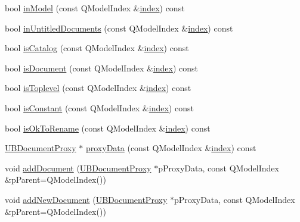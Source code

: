 \begin{DoxyCompactItemize}
bool \hyperlink{class_u_b_document_tree_model_a0177775331c363f33b5ed3139c14adc6}{in\-Model} (const Q\-Model\-Index \&\hyperlink{class_u_b_document_tree_model_a482d152ef1865a960d12f7d8726133b9}{index}) const 
\item 
bool \hyperlink{class_u_b_document_tree_model_a05755d6ea8c17fb69c62744c516566cd}{in\-Untitled\-Documents} (const Q\-Model\-Index \&\hyperlink{class_u_b_document_tree_model_a482d152ef1865a960d12f7d8726133b9}{index}) const 
\item 
bool \hyperlink{class_u_b_document_tree_model_a37960814e9120332dcdd89a88822737f}{is\-Catalog} (const Q\-Model\-Index \&\hyperlink{class_u_b_document_tree_model_a482d152ef1865a960d12f7d8726133b9}{index}) const 
\item 
bool \hyperlink{class_u_b_document_tree_model_ad6186a892df7569976b194849f17ff3f}{is\-Document} (const Q\-Model\-Index \&\hyperlink{class_u_b_document_tree_model_a482d152ef1865a960d12f7d8726133b9}{index}) const 
\item 
bool \hyperlink{class_u_b_document_tree_model_aba3afb7cd6c13d0b0b4eaaff4a521974}{is\-Toplevel} (const Q\-Model\-Index \&\hyperlink{class_u_b_document_tree_model_a482d152ef1865a960d12f7d8726133b9}{index}) const 
\item 
bool \hyperlink{class_u_b_document_tree_model_a55e684b2dc7fc9d961427b6b0313a2df}{is\-Constant} (const Q\-Model\-Index \&\hyperlink{class_u_b_document_tree_model_a482d152ef1865a960d12f7d8726133b9}{index}) const 
\item 
bool \hyperlink{class_u_b_document_tree_model_af562feb274191bf03e9656d27e177bef}{is\-Ok\-To\-Rename} (const Q\-Model\-Index \&\hyperlink{class_u_b_document_tree_model_a482d152ef1865a960d12f7d8726133b9}{index}) const 
\item 
\hyperlink{class_u_b_document_proxy}{U\-B\-Document\-Proxy} $\ast$ \hyperlink{class_u_b_document_tree_model_a2a35491b48b06e68645640eafc4b3ecc}{proxy\-Data} (const Q\-Model\-Index \&\hyperlink{class_u_b_document_tree_model_a482d152ef1865a960d12f7d8726133b9}{index}) const 
\item 
void \hyperlink{class_u_b_document_tree_model_ab34df78baad9b58d8e8c3f3a32bee007}{add\-Document} (\hyperlink{class_u_b_document_proxy}{U\-B\-Document\-Proxy} $\ast$p\-Proxy\-Data, const Q\-Model\-Index \&p\-Parent=Q\-Model\-Index())
\item 
void \hyperlink{class_u_b_document_tree_model_a8db99af8fb17b580f381b4bfe120918d}{add\-New\-Document} (\hyperlink{class_u_b_document_proxy}{U\-B\-Document\-Proxy} $\ast$p\-Proxy\-Data, const Q\-Model\-Index \&p\-Parent=Q\-Model\-Index())

\end{DoxyCompactItemize}
